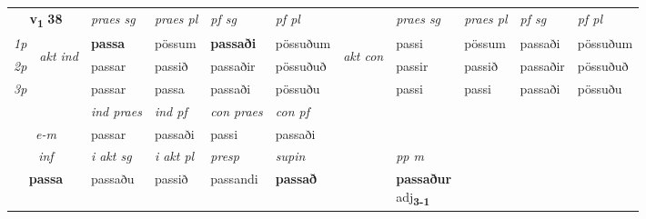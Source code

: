 \noindent
\begin{tabular}{lllllllllll} \toprule
\multicolumn{2}{c}{\textbf{v{\textsubscript{1}}} \Large{\textbf{38}}}  &  \textit{praes sg}  & \textit{praes pl}  &\textit{ pf sg} & \textit{pf pl} &  &  \textit{praes sg}  & \textit{praes pl}  & \textit{pf sg} & \textit{pf pl } \\*
	\cmidrule{3-6} \cmidrule{8-11}
 {\textit{1p}} & \multirow{3}{*}{\begin{turn}{90}\textit{akt ind}\end{turn}} & \textbf{passa} & pössum & \textbf{passaði} & pössuðum & \multirow{3}{*}{\begin{turn}{90}\textit{akt con}\end{turn}} &passi & pössum & passaði & pössuðum\\*
 {\textit{2p}} &  &  passar  & passið & passaðir & pössuðuð & & passir & passið & passaðir & pössuðuð \\*
{\textit{3p}} &  & passar & passa & passaði & pössuðu & & passi & passi& passaði & pössuðu \\*
\cmidrule{3-6} \cmidrule{8-11}

   & &  \textit{ind praes} & \textit{ind pf} & \textit{con praes} & \textit{con pf} \\*
\multicolumn{2}{c}{ \textit{e-m} } & passar & passaði & passi & passaði \\*

\cmidrule{3-8}
   \multicolumn{2}{c}{\textit{inf}}  & \textit{i akt sg} & \textit{i akt pl}   & \textit{presp} & \textit{supin}  && \textit{pp m} \\*
  \multicolumn{2}{c}{\textbf{passa}} & passaðu  & passið   & passandi &  \textbf{passað}  && \specialcell{\textbf{passaður} \\ adj\textbf{\textsubscript{3-1}}} \\*
\end{tabular}

